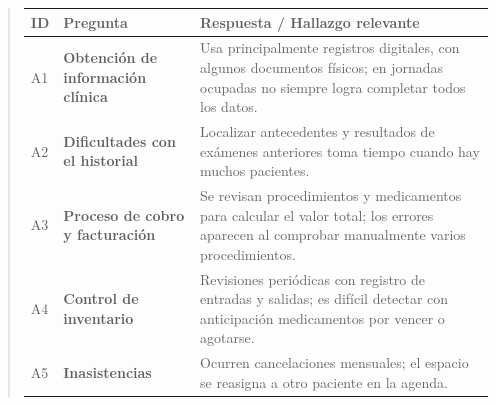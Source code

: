 \documentclass[
]{article}
\newcounter{none} %
\begin{document}
\begin{quote}
{\def\LTcaptype{none} %
\begin{longtable}[]{|
  >{\centering\arraybackslash}p{}|
  >{\raggedright\arraybackslash}p{}|
  >{\raggedright\arraybackslash}p{}|}
\hline
\begin{minipage}[b]{\linewidth}\centering
\textbf{ID}
\end{minipage} & \begin{minipage}[b]{\linewidth}\centering
\textbf{Pregunta}
\end{minipage} & \begin{minipage}[b]{\linewidth}\raggedright
\textbf{Respuesta / Hallazgo relevante}
\end{minipage} \\
\hline
\endhead
\hline
\endlastfoot
A1 & \textbf{Obtención de información clínica} &
\begin{minipage}[t]{\linewidth}\raggedright
Usa principalmente registros digitales, con algunos documentos físicos; en jornadas ocupadas no siempre logra completar todos los datos.
\end{minipage} \\
\hline
A2 & \textbf{Dificultades con el historial} &
\begin{minipage}[t]{\linewidth}\raggedright
Localizar antecedentes y resultados de exámenes anteriores toma tiempo cuando hay muchos pacientes.
\end{minipage} \\
\hline
A3 & \textbf{Proceso de cobro y facturación} &
\begin{minipage}[t]{\linewidth}\raggedright
Se revisan procedimientos y medicamentos para calcular el valor total; los errores aparecen al comprobar manualmente varios procedimientos.
\end{minipage} \\
\hline
A4 & \textbf{Control de inventario} &
\begin{minipage}[t]{\linewidth}\raggedright
Revisiones periódicas con registro de entradas y salidas; es difícil detectar con anticipación medicamentos por vencer o agotarse.
\end{minipage} \\
\hline
A5 & \textbf{Inasistencias} &
\begin{minipage}[t]{\linewidth}\raggedright
Ocurren cancelaciones mensuales; el espacio se reasigna a otro paciente en la agenda.
\end{minipage} \\

\end{longtable}}
\end{quote}
\end{document}
